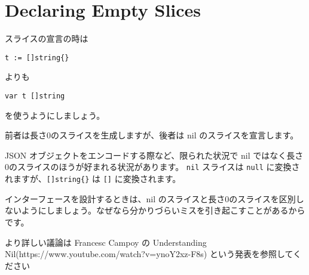 \section{Declaring Empty Slices}

スライスの宣言の時は

\begin{lstlisting}[]
t := []string{}
\end{lstlisting}

よりも

\begin{lstlisting}[]
var t []string
\end{lstlisting}

を使うようにしましょう。

前者は長さ0のスライスを生成しますが、後者は nil のスライスを宣言します。

JSON オブジェクトをエンコードする際など、限られた状況で nil ではなく長さ0のスライスのほうが好まれる状況があります。 \texttt{nil} スライスは \texttt{null} に変換されますが、\texttt{[]string\{\}} は \texttt{[]} に変換されます。

インターフェースを設計するときは、nil のスライスと長さ0のスライスを区別しないようにしましょう。なぜなら分かりづらいミスを引き起こすことがあるからです。

より詳しい議論は Francesc Campoy の Understanding Nil(https:\//\//www.youtube.com\//watch?v=ynoY2xz-F8s) という発表を参照してください

